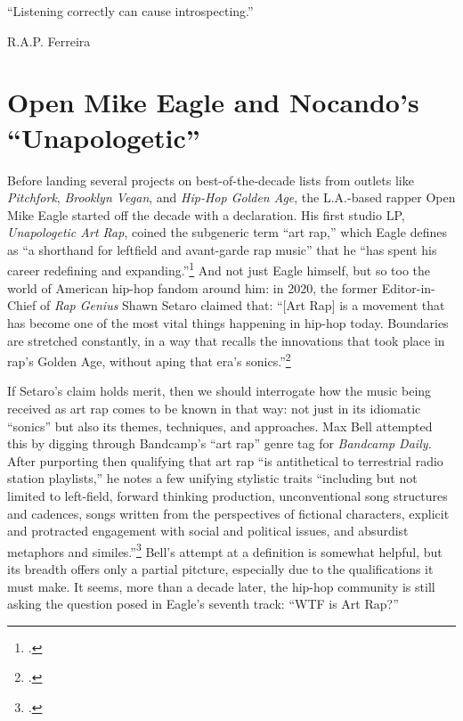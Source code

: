\onehalfspacing

\epigraph{{``Listening correctly can cause introspecting.''}}{R.A.P. Ferreira}

\section{Open Mike Eagle and Nocando's ``Unapologetic''}

Before landing several projects on best-of-the-decade lists from outlets like \textit{Pitchfork},
\textit{Brooklyn Vegan}, and \textit{Hip-Hop Golden Age}, the L.A.-based rapper Open Mike Eagle 
started off the decade with a declaration. His first studio LP, \textit{Unapologetic Art Rap}, coined
the subgeneric term ``art rap,'' which Eagle defines as ``a shorthand for leftfield and avant-garde rap 
music'' that he ``has spent his career redefining and expanding.''\footnote{
    \cite{openmikeeagle}.}
And not just Eagle himself, but so too the world of American hip-hop fandom around him: in 2020, the 
former Editor-in-Chief of \textit{Rap Genius} Shawn Setaro claimed that: ``[Art Rap] is a movement that
has become one of the most vital things happening in hip-hop today. Boundaries are stretched constantly,
in a way that recalls the innovations that took place in rap's Golden Age, without aping that era's 
sonics.''\footnote{\cite{shawnsetaroWhyYouShould2020}.}

If Setaro's claim holds merit, then we should interrogate how the music being received as art rap comes
to be known in that way: not just in its idiomatic ``sonics'' but also its themes, techniques, and 
approaches. Max Bell attempted this by digging through Bandcamp's ``art rap'' genre tag for 
\textit{Bandcamp  Daily.} After purporting then qualifying that art rap ``is antithetical to 
terrestrial radio station playlists,'' he notes a few unifying stylistic traits ``including but not limited
to left-field, forward thinking production, unconventional song structures and cadences, songs written 
from the perspectives of fictional characters, explicit and protracted engagement with social and political
issues, and absurdist metaphors and similes.''\footnote{
    \cite{maxbellWalkAvantGardeWorld2017}.} 
Bell's attempt at a definition is somewhat helpful, but its breadth offers only a partial pitcture, especially
due to the qualifications it must make. It seems, more than a decade later, the hip-hop community is still 
asking the question posed in Eagle's seventh track: ``WTF is Art Rap?''



